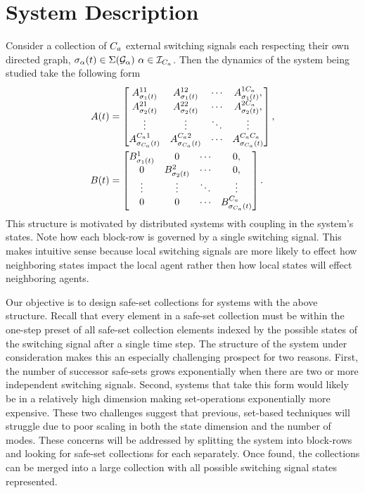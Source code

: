
\section{System Description}
Consider a collection of ${C_a}$ external switching signals each respecting their own directed graph, $\ss_\agentidx(t)\in\Sigma(\graph_\agentidx)\ \agentidx\in\idxset{\numagents}$. Then the dynamics of the system being studied take the following form
\begin{align}
A(t)&=\begin{bmatrix}
A^{11}_{{\sigma}_1(t)}&A^{12}_{{\sigma}_1(t)}&\cdots&A^{1{C_a}}_{{\sigma}_1(t)},\\
A^{21}_{{\sigma}_2(t)}&A^{22}_{{\sigma}_2(t)}&\cdots&A^{2{C_a}}_{{\sigma}_2(t)},\\
\vdots&\vdots & \ddots & \vdots\\
A^{{C_a} 1}_{{\sigma}_{{C_a}}(t)} & A^{{C_a} 2}_{{\sigma}_{{C_a}}(t)} &\cdots & A^{{C_a} {C_a}}_{{\sigma}_{{C_a}}(t)} 
\end{bmatrix},\\
B(t)&=\begin{bmatrix}
B^{1}_{{\sigma}_1(t)}&0&\cdots&0,\\
0&B^{2}_{{\sigma}_2(t)}&\cdots&0,\\
\vdots&\vdots & \ddots & \vdots\\
0 & 0 &\cdots & B^{{C_a}}_{{\sigma}_{{C_a}}(t)} 
\end{bmatrix}.
\end{align}
This structure is motivated by distributed systems with coupling in the system's states. Note how each block-row is governed by a single switching signal. This makes intuitive sense because local switching signals are more likely to effect how neighboring states impact the local agent rather then how local states will effect neighboring agents.

Our objective is to design safe-set collections for systems with the above structure. Recall that every element in a safe-set collection must be within the one-step preset of all safe-set collection elements indexed by the possible states of the switching signal after a single time step. The structure of the system under consideration makes this an especially challenging prospect for two reasons. First, the number of successor safe-sets grows exponentially when there are two or more independent switching signals. Second, systems that take this form would likely be in a relatively high dimension making set-operations exponentially more expensive. These two challenges suggest that previous, set-based techniques will struggle due to poor scaling in both the state dimension and the number of modes. These concerns will be addressed by splitting the system into block-rows and looking for safe-set collections for each separately. Once found, the collections can be merged into a large collection with all possible switching signal states represented.

